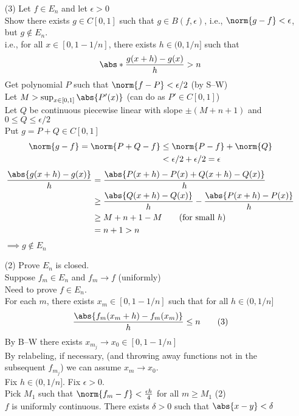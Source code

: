\begin{enumerate}
\item[(3)] Let $f\in E_n$ and let $\epsilon>0$ \\
Show there exists $g\in C[0,1]$ such that $g\in B(f,\epsilon)$, i.e., $\norm{g-f}<\epsilon$, but $g\notin E_n$. \\
i.e., for all $x\in[0,1-1/n]$, there exists $h\in(0,1/n]$ such that
\[ \abs*{\frac{g(x+h)-g(x)}{h}} > n \]
Get polynomial $P$ such that $\norm{f-P}<\epsilon/2$ (by S--W) \\
Let $M>\sup_{x\in[0,1]}\abs{P'(x)}$ (can do as $P'\in C[0,1]$) \\
Let $Q$ be continuous piecewise linear with slope $\pm(M+n+1)$ and $0\leq Q\leq\epsilon/2$ \\
Put $g=P+Q\in C[0,1]$
\begin{align*}
\norm{g-f} = \norm{P+Q-f} &\leq \norm{P-f} + \norm{Q} \\
&< \epsilon/2 + \epsilon/2 = \epsilon
\end{align*}
\begin{align*}
\frac{\abs{g(x+h)-g(x)}}{h} &= \frac{\abs{P(x+h)-P(x)+Q(x+h)-Q(x)}}{h} \\
&\geq \frac{\abs{Q(x+h)-Q(x)}}{h} - \frac{\abs{P(x+h)-P(x)}}{h} \\
&\geq M + n + 1 - M \qquad\text{(for small $h$)} \\
&= n+1 > n
\end{align*}
\negthickspace$\implies g\notin E_n$
\item[(2)] Prove $E_n$ is closed. \\
Suppose $f_m\in E_n$ and $f_m\to f$ (uniformly) \\
Need to prove $f\in E_n$. \\
For each $m$, there exists $x_m\in[0,1-1/n]$ such that for all $h\in(0,1/n]$
\[ \frac{\abs{f_m(x_m+h)-f_m(x_m)}}{h} \leq n \tag{3} \]
By B--W there exists $x_{m_j}\to x_0\in[0,1-1/n]$ \\
By relabeling, if necessary, (and throwing away functions not in the subsequent $f_{m_j}$) we can assume $x_m\to x_0$. \\
Fix $h\in(0,1/n]$.  Fix $\epsilon>0$. \\
Pick $M_1$ such that $\norm{f_m-f}<\frac{\epsilon h}{4}$ for all $m\geq M_1$ (2) \\
$f$ is uniformly continuous.  There exists $\delta>0$ such that $\abs{x-y}<\delta$ \\

\end{enumerate}
